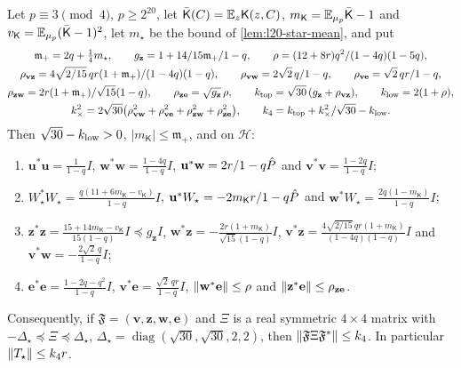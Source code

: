 \begin{proposition}\label{prop:l20-rank4}
Let $p\equiv3\pmod4$, $p\ge2^{20}$, let
$\bar{\mathsf K}(C)=\E_z\mathsf K(z,C)$, $m_{\mathsf K}=\E_{\mu_p}\bar{\mathsf K}-1$
and $v_{\mathsf K}=\E_{\mu_p}(\bar{\mathsf K}-1)^2$, let $m_\star$ be the bound
of \cref{lem:l20-star-mean}, and put
\begin{gather*}
 \mathfrak m_+=2q+\tfrac14m_\star,\qquad
 g_{\mathbf z}=\frac{1+\frac{14}{15}\mathfrak m_+}{1-q},\qquad
 \rho=\frac{(12+8r)q^2}{(1-4q)(1-5q)},\\
 \rho_{\mathbf v\mathbf z}=\frac{4\sqrt{2/15}\,qr(1+\mathfrak m_+)}{(1-4q)(1-q)},\qquad
 \rho_{\mathbf v\mathbf w}=\frac{2\sqrt2\,q}{1-q},\qquad
 \rho_{\mathbf v\mathbf e}=\frac{\sqrt2\,qr}{1-q},\\
 \rho_{\mathbf z\mathbf w}=\frac{2r(1+\mathfrak m_+)}{\sqrt{15}(1-q)},\qquad
 \rho_{\mathbf z\mathbf e}=\sqrt{g_{\mathbf z}}\,\rho,\qquad
 k_{\rm top}=\sqrt{30}\,(g_{\mathbf z}+\rho_{\mathbf v\mathbf z}),\qquad
 k_{\rm low}=2(1+\rho),\\
 k_\times^2=2\sqrt{30}\bigl(\rho_{\mathbf v\mathbf w}^2+\rho_{\mathbf v\mathbf e}^2
 +\rho_{\mathbf z\mathbf w}^2+\rho_{\mathbf z\mathbf e}^2\bigr),\qquad
 k_4=k_{\rm top}+\frac{k_\times^2}{\sqrt{30}-k_{\rm low}}.
\end{gather*}
Then $\sqrt{30}-k_{\rm low}>0$, $|m_{\mathsf K}|\le\mathfrak m_+$, and on
$\mathcal H$:
\begin{enumerate}[label=\textup{(\alph*)}]
\item $\mathbf u^*\mathbf u=\frac1{1-q}I$,
 $\mathbf w^*\mathbf w=\frac{1-4q}{1-q}I$,
 $\mathbf u^*\mathbf w=\frac{2r}{1-q}\Phat$ and
 $\mathbf v^*\mathbf v=\frac{1-2q}{1-q}I$;
\item $W_\star^*W_\star=\frac{q(11+6m_{\mathsf K}-v_{\mathsf K})}{1-q}I$,
 $\mathbf u^*W_\star=-\frac{2m_{\mathsf K}r}{1-q}\Phat$ and
 $\mathbf w^*W_\star=\frac{2q(1-m_{\mathsf K})}{1-q}I$;
\item $\mathbf z^*\mathbf z=\frac{15+14m_{\mathsf K}-v_{\mathsf K}}{15(1-q)}I
 \preceq g_{\mathbf z}I$,
 $\mathbf w^*\mathbf z=-\frac{2r(1+m_{\mathsf K})}{\sqrt{15}(1-q)}I$,
 $\mathbf v^*\mathbf z=\frac{4\sqrt{2/15}\,qr(1+m_{\mathsf K})}{(1-4q)(1-q)}I$ and
 $\mathbf v^*\mathbf w=-\frac{2\sqrt2\,q}{1-q}I$;
\item $\mathbf e^*\mathbf e=\frac{1-2q-q^2}{1-q}I$,
 $\mathbf v^*\mathbf e=\frac{\sqrt2\,qr}{1-q}I$,
 $\norm{\mathbf w^*\mathbf e}\le\rho$ and
 $\norm{\mathbf z^*\mathbf e}\le\rho_{\mathbf z\mathbf e}$.
\end{enumerate}
Consequently, if $\mathfrak F=(\mathbf v,\mathbf z,\mathbf w,\mathbf e)$ and
$\Xi$ is a real symmetric $4\times4$ matrix with
$-\Delta_\star\preceq\Xi\preceq\Delta_\star$,
$\Delta_\star=\operatorname{diag}(\sqrt{30},\sqrt{30},2,2)$, then
$\norm{\mathfrak F\Xi\mathfrak F^*}\le k_4$. In particular
$\norm{T_\star}\le k_4r$.
\end{proposition}

